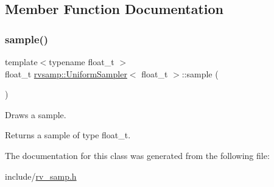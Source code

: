\subsection{Member Function Documentation}
\mbox{\label{classrvsamp_1_1UniformSampler_acc8866283171489eccc5f643269b6eed}} 
\subsubsection{\texorpdfstring{sample()}{sample()}}
{\footnotesize\ttfamily template$<$typename float\+\_\+t $>$ \\
float\+\_\+t \hyperlink{classrvsamp_1_1UniformSampler}{rvsamp\+::\+Uniform\+Sampler}$<$ float\+\_\+t $>$\+::sample (\begin{DoxyParamCaption}{ }\end{DoxyParamCaption})}



Draws a sample. 

\begin{DoxyReturn}{Returns}
a sample of type float\+\_\+t. 
\end{DoxyReturn}


The documentation for this class was generated from the following file\+:\begin{DoxyCompactItemize}
\item 
include/\hyperlink{rv__samp_8h}{rv\+\_\+samp.\+h}\end{DoxyCompactItemize}
